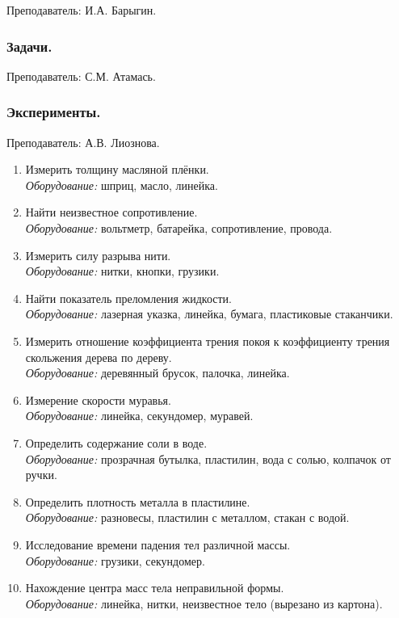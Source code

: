 \documentclass[12pt,a4paper,oneside]{scrartcl}
\begin{document}
\textsf{Преподаватель: И.А. Барыгин.}

\subsubsection{Задачи.}
\label{sec:daily_9_problems}

\textsf{Преподаватель: С.М. Атамась.}

\subsubsection{Эксперименты.}
\label{sec:daily_9_exp}

\textsf{Преподаватель: А.В. Лиознова.}

\begin{enumerate}
\item Измерить толщину масляной плёнки. \\ \textit{Оборудование:} шприц, масло, линейка.
\item Найти неизвестное сопротивление. \\ \textit{Оборудование:} вольтметр, батарейка, сопротивление, провода.
\item Измерить силу разрыва нити. \\ \textit{Оборудование:} нитки, кнопки, грузики.
\item Найти показатель преломления жидкости. \\ \textit{Оборудование:} лазерная указка, линейка, бумага, пластиковые стаканчики.
\item Измерить отношение коэффициента трения покоя к коэффициенту
  трения скольжения дерева по дереву. \\ \textit{Оборудование:} деревянный брусок, палочка, линейка.
\item Измерение скорости муравья.  \\ \textit{Оборудование:} линейка,
  секундомер, муравей.
\item Определить содержание соли в воде. \\ \textit{Оборудование:}
  прозрачная бутылка, пластилин, вода с солью, колпачок от ручки.
\item Определить плотность металла в пластилине. \\
  \textit{Оборудование:} разновесы, пластилин с металлом, стакан с
  водой.
\item Исследование времени падения тел различной массы. \\
  \textit{Оборудование:} грузики, секундомер.
\item Нахождение центра масс тела неправильной формы. \\
  \textit{Оборудование:} линейка, нитки, неизвестное тело (вырезано из
  картона).
\end{enumerate}
\end{document}

